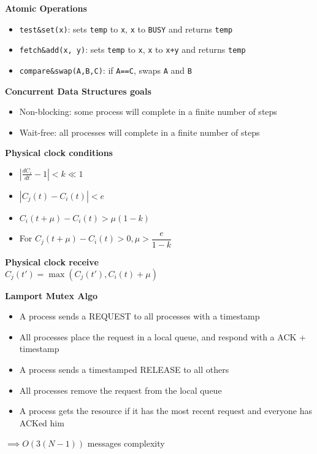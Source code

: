 \documentclass[10pt,letterpaper,landscape]{report}
\newcommand{\boxheight}{21.59cm}
\newcommand{\boxwidth}{8.85cm}
\begin{document}
\begin{small}
{\begin{minipage}[t][\boxheight][c]{\boxwidth}
	\textbf{Atomic Operations}
	\begin{itemize}
	    \item \texttt{test\&set(x)}: sets \texttt{temp} to \texttt{x}, \texttt{x} to \texttt{BUSY} and returns \texttt{temp}
	    \item \texttt{fetch\&add(x, y)}: sets \texttt{temp} to \texttt{x}, \texttt{x} to \texttt{x+y} and returns \texttt{temp} 
	    \item \texttt{compare\&swap(A,B,C)}: if \texttt{A==C}, swaps \texttt{A} and \texttt{B}
	\end{itemize}

    \textbf{Concurrent Data Structures goals}
    \begin{itemize}
        \item Non-blocking: some process will complete in a finite number of steps
        \item Wait-free: all processes will complete in a finite number of steps
    \end{itemize}
    
    \textbf{Physical clock conditions}
    \begin{itemize}
        \item $\left| \frac{dC_i}{dt} -1 \right| < k \ll 1$
        \item $|C_j(t) - C_i(t) | < e$
        \item $C_i(t + \mu) - C_i(t) > \mu (1-k)$
        \item For $C_j(t + \mu) - C_i(t) > 0, \mu > \dfrac{e}{1-k}$ 
    \end{itemize}
    
    \textbf{Physical clock receive}\\
    $C_j(t') = \max(C_j(t'), C_i(t) + \mu)$

    \textbf{Lamport Mutex Algo}
    \begin{itemize}
        \item A process sends a REQUEST to all processes with a timestamp
        \item All processes place the request in a local queue, and respond with a ACK + timestamp
        \item A process sends a timestamped RELEASE to all others
        \item All processes remove the request from the local queue
        \item A process gets the resource if it has the most recent request and everyone has ACKed him
    \end{itemize}
    $\implies O(3(N-1))$ messages complexity
    

\end{minipage}}
\end{small}
\end{document}
